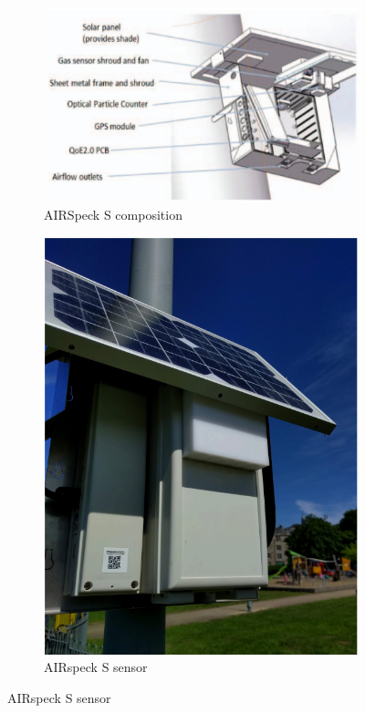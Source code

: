\begin{figure}[H]
\centering
\begin{subfigure}{0.48\textwidth}
\includegraphics[width=\linewidth]{images/Airspeck_P_inside.png}
\caption{AIRSpeck S composition \cite{clinical_trials}} \label{fig:a}
\end{subfigure}
\begin{subfigure}{0.48\textwidth}
\includegraphics[width=\linewidth]{images/AirspeckS.png}
\caption{AIRspeck S sensor \cite{zoe}} \label{fig:b}
\end{subfigure}


\end{figure}
